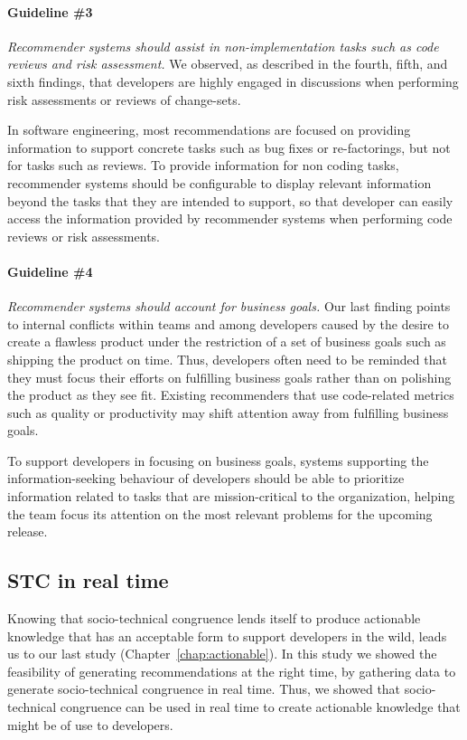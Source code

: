 \paragraph{Guideline \#3} \emph{Recommender systems should assist in non-implementation tasks such as code reviews and risk assessment.} 
We observed, as described in the fourth, fifth, and sixth findings, that developers are highly engaged in discussions when performing risk assessments or reviews of change-sets. 

In software engineering, most recommendations are focused on providing information to support concrete tasks such as bug fixes or re-factorings, but not for tasks such as reviews. To provide information for non coding tasks, recommender systems should be configurable to display relevant information beyond the tasks that they are intended to support, so that developer can easily access the information provided by recommender systems when performing code reviews or risk assessments.

\paragraph{Guideline \#4} \emph{Recommender systems should account for business goals.}
Our last finding points to internal conflicts within teams and among developers caused by the desire to create a flawless product under the restriction of a set of business goals such as shipping the product on time.
Thus, developers often need to be reminded that they must focus their efforts on fulfilling business goals rather than on polishing the product as they see fit. Existing recommenders that use code-related metrics such as quality or productivity may shift attention away from fulfilling business goals.

To support developers in focusing on business goals, systems supporting the information-seeking behaviour of developers should be able to prioritize information related to tasks that are mission-critical to the organization, helping the team focus its attention on the most relevant problems for the upcoming release.


\subsection{STC in real time}
Knowing that socio-technical congruence lends itself to produce actionable knowledge that has an acceptable form to support developers in the wild, leads us to our last study (Chapter~\ref{chap:actionable}).
In this study we showed the feasibility of generating recommendations at the right time, by gathering data to generate socio-technical congruence in real time.
Thus, we showed that socio-technical congruence can be used in real time to create actionable knowledge that might be of use to developers.



